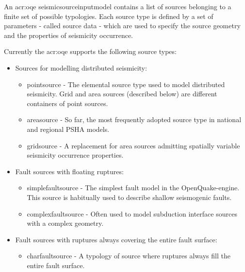 An \gls{acr:oqe} \gls{seismicsourceinputmodel} contains a list of sources
belonging to a finite set of possible typologies. Each source type is defined
by a set of parameters - called source data - which are used to specify the
source geometry and the properties of seismicity occurrence.

Currently the \gls{acr:oqe} supports the following source types:

\begin{itemize}

    \item Sources for modelling distributed seismicity:

    \begin{itemize}

        \item \Gls{pointsource} - The elemental source type used to model
        distributed seismicity. Grid and area sources (described below) are
        different containers of point sources.

        \item \Gls{areasource} - So far, the most frequently adopted source
        type in national and regional PSHA models.

        \item \Gls{gridsource} - A replacement for area sources admitting
        spatially variable seismicity occurrence properties.

    \end{itemize}

    \item Fault sources with floating ruptures:

    \begin{itemize}

        \item \Gls{simplefaultsource} - The simplest fault model in the
        OpenQuake-engine. This source is habitually used to describe shallow
        seismogenic faults.

        \item \Gls{complexfaultsource} - Often used to model subduction
        interface sources with a complex geometry.

    \end{itemize}

    \item Fault sources with ruptures always covering the entire fault surface:

    \begin{itemize}

        \item \Gls{charfaultsource} - A typology of source where ruptures
        always fill the entire fault surface.

    \end{itemize}

\end{itemize}

